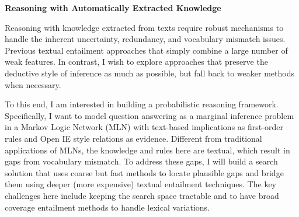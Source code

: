 \documentclass[a4paper,11pt,onecolumn]{article}
\newcommand{\eat}[1]{}
\begin{document}
\eat{
{\bf Event Extraction and Reference Resolution}

Scalable event extraction requires open domain models of events. Existing methods have used manual templates or use probabilistic methods that are unlikely to scale.%
Open event schemas are coherent models of the key actors and their roles and thus provide a strong basis constructing high-quality extractors at scale. Expanding schemas to include extractors can be viewed as a bootstrapping procedure starting from a strong high-quality model of an event. As with any bootstrapping approach the challenges are in finding appropriate sources for expansion and avoiding drifting from the source model. 

Resolving co-reference is a challenging problem that requires broad semantic knowledge in the form of type constraints. Consider the following sentence: ``[People] travel to see their [families] when [they] find cheap flights to take [them]". [they] can resolve to families or [people]. Resolving pronouns in this sentence requires the system to know that the entity that travels is the one that is likely to find flights. Rel-grams provides a framework for aggregating this kind of background knowledge. One of the key challenges is the precision/recall trade-off. Past attempts at improving co-reference by adding semantics have mixed results because they either lack coverage or are too imprecise due to over-generalization. Rel-grams addresses this to some extent by including more context to improve accuracy and semantic classes to improve generalization.

{\bf Process Knowledge}
}
{\bf Reasoning with Automatically Extracted Knowledge}

Reasoning with knowledge extracted from texts require robust mechanisms to handle the inherent uncertainty, redundancy, and vocabulary mismatch issues. Previous textual entailment approaches that simply combine a large number of weak features. In contrast, I wish to explore approaches that preserve the deductive style of inference as much as possible, but fall back to weaker methods when necessary.  

To this end, I am interested in building a probabilistic reasoning framework. Specifically, I want to model question answering as a marginal inference problem in a Markov Logic Network (MLN) with text-based implications as first-order rules and Open IE style relations as evidence. Different from traditional applications of MLNs, the knowledge and rules here are textual, which result in gaps from vocabulary mismatch. To address these gaps, I will build a search solution that uses coarse but fast methods to locate plausible gaps and bridge them using deeper (more expensive) textual entailment techniques. The key challenges here include keeping the search space tractable and to have broad coverage entailment methods to handle lexical variations. 
\end{document}
